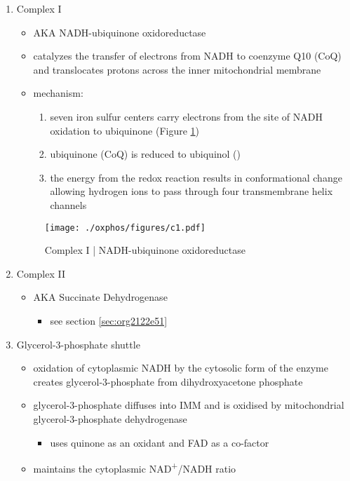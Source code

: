 \documentclass{scrartcl}
\begin{document}
\begin{enumerate}
\item Complex I
\label{sec:orgf94bd90}
\begin{itemize}
\item AKA NADH-ubiquinone oxidoreductase
\item catalyzes the transfer of electrons from NADH to coenzyme Q10
(CoQ) and translocates protons across the inner mitochondrial
membrane
\end{itemize}

{\small{}}

\begin{itemize}
\item mechanism: 
\begin{enumerate}
\item seven iron sulfur centers carry electrons from the site of NADH
oxidation to ubiquinone (Figure \ref{fig:org1f563e2})
\item ubiquinone (CoQ) is reduced to ubiquinol ()
\item the energy from the redox reaction results in conformational
change allowing hydrogen ions to pass through four transmembrane
helix channels
\end{enumerate}
\end{itemize}

\begin{figure}[htbp]
\centering
\texttt{[image: ./oxphos/figures/c1.pdf]}
\caption[c1]{\label{fig:org1f563e2}Complex I | NADH-ubiquinone oxidoreductase}
\end{figure}

\item Complex II
\label{sec:org991cd1f}
\begin{itemize}
\item AKA Succinate Dehydrogenase 
\begin{itemize}
\item see section \ref{sec:org2122e51}
\end{itemize}
\end{itemize}

\item Glycerol-3-phosphate shuttle
\label{sec:org32f5365}
\begin{itemize}
\item oxidation of cytoplasmic NADH by the cytosolic form of the enzyme
creates glycerol-3-phosphate from dihydroxyacetone phosphate
\item glycerol-3-phosphate diffuses into IMM and is oxidised by mitochondrial glycerol-3-phosphate dehydrogenase
\begin{itemize}
\item uses quinone as an oxidant and FAD as a co-factor
\end{itemize}
\item maintains the cytoplasmic NAD\textsuperscript{+}/NADH ratio
\end{itemize}


\end{enumerate}
\end{document}
